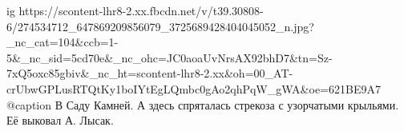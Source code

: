  
 
 
 
 

\ifcmt
  ig https://scontent-lhr8-2.xx.fbcdn.net/v/t39.30808-6/274534712_647869209856079_3725689428404045052_n.jpg?_nc_cat=104&ccb=1-5&_nc_sid=5cd70e&_nc_ohc=JC0aoaUvNrsAX92bhD7&tn=Sz-7xQ5oxc85gbiv&_nc_ht=scontent-lhr8-2.xx&oh=00_AT-crUbwGPLusRTQtKy1boIYtEgLQmbc0gAo2qhPqW_gWA&oe=621BE9A7
	@caption В Саду Камней. А здесь спряталась стрекоза с узорчатыми крыльями. Её выковал А. Лысак.
\fi
